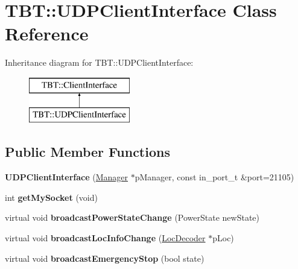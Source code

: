 \hypertarget{classTBT_1_1UDPClientInterface}{}\section{T\+BT\+:\+:U\+D\+P\+Client\+Interface Class Reference}
\label{classTBT_1_1UDPClientInterface}
Inheritance diagram for T\+BT\+:\+:U\+D\+P\+Client\+Interface\+:\begin{figure}[H]
\begin{center}
\leavevmode
\includegraphics[height=2.000000cm]{classTBT_1_1UDPClientInterface}
\end{center}
\end{figure}
\subsection*{Public Member Functions}
\begin{DoxyCompactItemize}
\item 
\mbox{\label{classTBT_1_1UDPClientInterface_ad03356f6abf16596c181851e9fcaf7a9}} 
{\bfseries U\+D\+P\+Client\+Interface} (\hyperlink{classTBT_1_1Manager}{Manager} $\ast$p\+Manager, const in\+\_\+port\+\_\+t \&port=21105)
\item 
\mbox{\label{classTBT_1_1UDPClientInterface_ac25b06823d045631f3c7b76e9c50f22e}} 
int {\bfseries get\+My\+Socket} (void)
\item 
\mbox{\label{classTBT_1_1UDPClientInterface_ad65d92928ce6f459c371c44c5576dbcc}} 
virtual void {\bfseries broadcast\+Power\+State\+Change} (Power\+State new\+State)
\item 
\mbox{\label{classTBT_1_1UDPClientInterface_af4e63115b3156b151d4dfd50342b36e7}} 
virtual void {\bfseries broadcast\+Loc\+Info\+Change} (\hyperlink{classTBT_1_1LocDecoder}{Loc\+Decoder} $\ast$p\+Loc)
\item 
\mbox{\label{classTBT_1_1UDPClientInterface_a7fca1a79378823f67b0f23bbd59dc041}} 
virtual void {\bfseries broadcast\+Emergency\+Stop} (bool state)
\end{DoxyCompactItemize}
